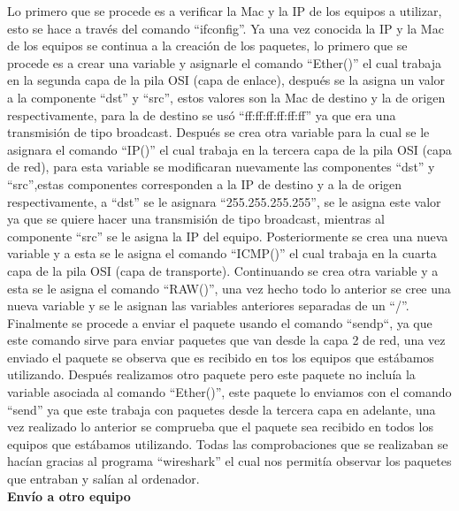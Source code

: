 \documentclass{udpreport}
\begin{document}
		Lo primero que se procede es a verificar la Mac y la IP de los  equipos a utilizar, esto se hace a través del comando “ifconfig”. Ya una vez conocida la IP y la Mac de los equipos se continua a la creación de los paquetes, lo primero que se procede es a crear una variable y asignarle el comando  “Ether()” el cual trabaja en la segunda capa de la pila OSI (capa de enlace), después se la asigna un valor a la componente “dst” y “src”, estos valores son la Mac de destino y la de origen respectivamente, para la de destino se usó “ff:ff:ff:ff:ff:ff” ya que era una transmisión de tipo broadcast. Después se crea otra variable para la cual se le asignara el comando “IP()” el cual trabaja en la tercera capa de la pila OSI (capa de red), para esta variable se modificaran nuevamente las componentes “dst” y “src”,estas componentes corresponden a la IP de destino y a la de origen respectivamente, a “dst” se le asignara “255.255.255.255”, se le asigna este valor ya que se quiere hacer una transmisión de tipo broadcast, mientras al componente “src” se le asigna la IP del equipo. Posteriormente se crea una nueva variable y a esta se le asigna el comando “ICMP()” el cual trabaja en la cuarta capa de la pila OSI (capa de transporte). Continuando se crea otra variable y a esta se le asigna el comando “RAW()”, una vez hecho todo lo anterior se cree una nueva variable y se le asignan las variables anteriores separadas de un “/”. Finalmente se procede a enviar el paquete usando el comando “sendp“, ya que este comando sirve para enviar paquetes que van desde la capa 2 de red, una vez enviado el paquete se observa que es recibido en tos los equipos que estábamos utilizando. Después realizamos otro paquete pero este paquete no incluía la variable asociada al comando “Ether()”, este paquete lo enviamos con el comando “send” ya que este trabaja con paquetes desde la tercera capa en adelante, una vez realizado lo anterior se comprueba que el paquete sea recibido en todos los equipos que estábamos utilizando. Todas las comprobaciones que se realizaban se hacían gracias al programa “wireshark” el cual nos permitía observar los paquetes que entraban y salían al ordenador.\\
		{\bf \large Envío a otro equipo}\\
\end{document}
